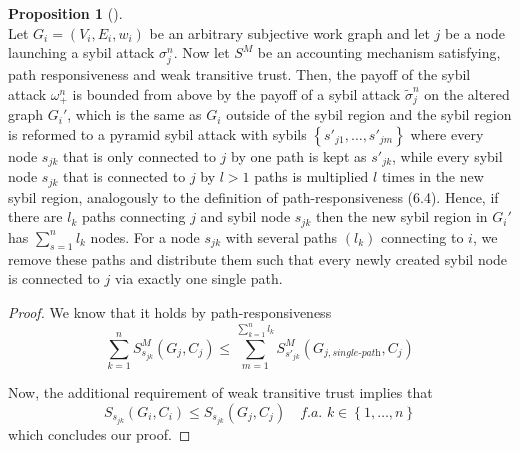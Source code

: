 \documentclass[11pt,a4paper]{report}
\theoremstyle{definition}
\newtheorem{definition}{Definition}[section]
\theoremstyle{theorem}
\theoremstyle{proposition}
\newtheorem{proposition}{Proposition}[section]
\theoremstyle{corollary}
\theoremstyle{lemma}
\theoremstyle{example}
\theoremstyle{remark}
\begin{document}

\begin{proposition}[]\ \\
Let $G_i=(V_i,E_i,w_i)$ be an arbitrary subjective work graph and let $j$ be a node launching a sybil attack $\sigma_j^n$. Now let $S^M$ be an accounting mechanism satisfying, path responsiveness and weak transitive trust. Then, the payoff of the sybil attack $\omega_{+}^n$ is bounded from above by the payoff of a sybil attack $\tilde{\sigma}_j^n$ on the altered graph $G_i'$, which is the same as $G_i$ outside of the sybil region and the sybil region is reformed to a pyramid sybil attack with sybils $\left\lbrace{}s'_{j1},\ldots,s'_{jm}\right\rbrace$ where every node $s_{jk}$ that is only connected to $j$ by one path is kept as $s'_{jk}$, while every sybil node $s_{jk}$ that is connected to $j$ by $l>1$ paths is multiplied $l$ times in the new sybil region, analogously to the definition of path-responsiveness (6.4). Hence, if there are $l_k$ paths connecting $j$ and sybil node $s_{jk}$ then the new sybil region in $G_i'$ has $\sum\limits_{s=1}^{n}l_k$ nodes. For a node $s_{jk}$ with several paths $(l_k)$ connecting to $i$, we remove these paths and distribute them such that every newly created sybil node is connected to $j$ via exactly one single path.  
\end{proposition}
\begin{proof}
We know that it holds by path-responsiveness 
\[
\sum\limits_{k=1}^{n}S^M_{s_{jk}}(G_j,C_j)\leq\sum\limits_{m=1}^{\sum\limits_{k=1}^{n}l_k}S^M_{s'_{jk}}(G_{j,\textit{single-path}},C_j)
\] 

\noindent{}Now, the additional requirement of weak transitive trust implies that 
\[
S_{s_{jk}}(G_i,C_i)\leq{}S_{s_{jk}}(G_j,C_j)\quad\textit{f.a. }k\in\left\lbrace{}1,\ldots,n\right\rbrace
\]
\noindent{} which concludes our proof. 
\end{proof}
\end{document}
